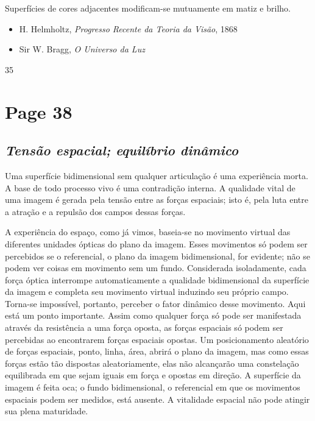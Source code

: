 \documentclass[a4paper]{article}
\begin{document}
Superfícies de cores adjacentes modificam-se mutuamente em matiz e brilho.

\begin{itemize}
    \item H. Helmholtz, \textit{Progresso Recente da Teoria da Visão}, 1868
    \item Sir W. Bragg, \textit{O Universo da Luz}
\end{itemize}

\vspace{\baselineskip}
\hfill 35

\newpage
\section*{Page 38}

\subsection*{{\itshape Tensão espacial; equilíbrio dinâmico}}

Uma superfície bidimensional sem qualquer articulação é uma experiência morta. A base de todo processo vivo é uma contradição interna. A qualidade vital de uma imagem é gerada pela tensão entre as forças espaciais; isto é, pela luta entre a atração e a repulsão dos campos dessas forças.

A experiência do espaço, como já vimos, baseia-se no movimento virtual das diferentes unidades ópticas do plano da imagem. Esses movimentos só podem ser percebidos se o referencial, o plano da imagem bidimensional, for evidente; não se podem ver coisas em movimento sem um fundo. Considerada isoladamente, cada força óptica interrompe automaticamente a qualidade bidimensional da superfície da imagem e completa seu movimento virtual induzindo seu próprio campo. Torna-se impossível, portanto, perceber o fator dinâmico desse movimento. Aqui está um ponto importante. Assim como qualquer força só pode ser manifestada através da resistência a uma força oposta, as forças espaciais só podem ser percebidas ao encontrarem forças espaciais opostas. Um posicionamento aleatório de forças espaciais, ponto, linha, área, abrirá o plano da imagem, mas como essas forças estão tão dispostas aleatoriamente, elas não alcançarão uma constelação equilibrada em que sejam iguais em força e opostas em direção. A superfície da imagem é feita oca; o fundo bidimensional, o referencial em que os movimentos espaciais podem ser medidos, está ausente. A vitalidade espacial não pode atingir sua plena maturidade.
\end{document}
